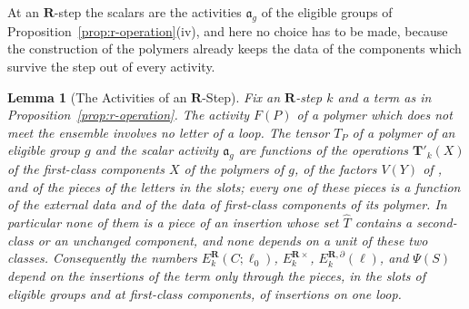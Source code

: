 \documentclass[11pt]{preprint}
\numberwithin{equation}{section}
\newtheorem{lemma}{Lemma}[section]
\theoremstyle{definition}
\theoremstyle{remark}
\theoremstyle{plain}
\begin{document}
At an $\mathbf R$-step the scalars are the activities $\mathfrak a_g$ of the eligible groups of Proposition~\ref{prop:r-operation}(iv), and here no choice has to be made, because the construction of the polymers already keeps the data of the components which survive the step out of every activity.

\begin{lemma}[The Activities of an $\mathbf R$-Step]\label{lem:r-activities-content}
Fix an $\mathbf R$-step $k$ and a term as in Proposition~\ref{prop:r-operation}. The activity $F(P)$ of a polymer which does not meet the ensemble involves no letter of a loop. The tensor $T_P$ of a polymer of an eligible group $g$ and the scalar activity $\mathfrak a_g$ are functions of the operations $\mathbf T'_k(X)$ of the first-class components $X$ of the polymers of $g$, of the factors $V(Y)$ of \cite[(1.91)]{BalabanLFR2}, and of the pieces of the letters in the slots; every one of these pieces is a function of the external data and of the data of first-class components of its polymer. In particular none of them is a piece of an insertion whose set $\hat T$ contains a second-class or an unchanged component, and none depends on a unit of these two classes. Consequently the numbers $E^{\mathbf R}_k(C; \ell_0)$, $E^{\mathbf R\times}_k$, $E^{\mathbf R,\partial}_k(\ell)$, and $\Psi(S)$ depend on the insertions of the term only through the pieces, in the slots of eligible groups and at first-class components, of insertions on one loop.
\end{lemma}
\end{document}
